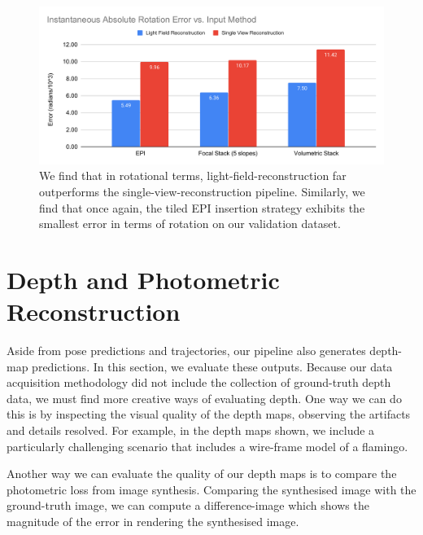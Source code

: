 \begin{figure}[H]
    \includegraphics[width=\textwidth]{images/result-examples/bargraphs/iare-vs-input-method.pdf}
    \caption{We find that in rotational terms, light-field-reconstruction far outperforms the single-view-reconstruction pipeline. Similarly, we find that once again, the tiled EPI insertion strategy exhibits the smallest error in terms of rotation on our validation dataset.}
\end{figure}
\section{Depth and Photometric Reconstruction}

Aside from pose predictions and trajectories, our pipeline also generates depth-map predictions. In this section, we evaluate these outputs. Because our data acquisition methodology did not include the collection of ground-truth depth data, we must find more creative ways of evaluating depth. One way we can do this is by inspecting the visual quality of the depth maps, observing the artifacts and details resolved. For example, in the depth maps shown, we include a particularly challenging scenario that includes a wire-frame model of a flamingo. 

Another way we can evaluate the quality of our depth maps is to compare the photometric loss from image synthesis. Comparing the synthesised image with the ground-truth image, we can compute a difference-image which shows the magnitude of the error in rendering the synthesised image.


